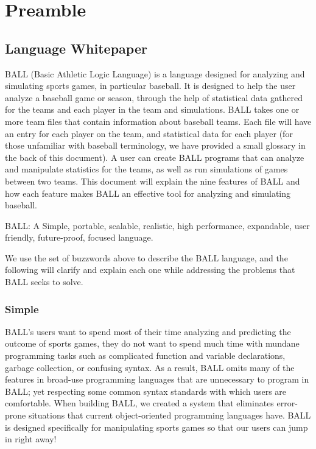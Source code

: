 
\chapter{Preamble}\label{intro}

\section{Language Whitepaper}\label{whitepaper}
BALL (Basic Athletic Logic Language) is a language designed for analyzing and simulating sports games, in particular baseball. It is designed to help the user analyze a baseball game or season, through the help of statistical data gathered for the teams and each player in the team and simulations. BALL takes one or more team files that contain information about baseball teams. Each file will have an entry for each player on the team, and statistical data for each player (for those unfamiliar with baseball terminology, we have provided a small glossary in the back of this document).  A user can create BALL programs that can analyze and manipulate statistics for the teams, as well as run simulations of games between two teams. This document will explain the nine features of BALL and how each feature makes BALL an effective tool for analyzing and simulating baseball.

BALL: A Simple, portable, scalable, realistic, high performance, expandable, user friendly, future-proof, focused language.

We use the set of buzzwords above to describe the BALL language, and the following will clarify and explain each one while addressing the problems that BALL seeks to solve.

\subsection{Simple}
BALL's users want to spend most of their time analyzing and predicting the outcome of sports games, they do not want to spend much time with mundane programming tasks such as complicated function and variable declarations, garbage collection, or confusing syntax. As a result, BALL omits many of the features in broad-use programming languages that are unnecessary to program in BALL; yet respecting some common syntax standards with which users are comfortable. When building BALL, we created a system that eliminates error-prone situations that current object-oriented programming languages have.  BALL is designed specifically for manipulating sports games so that our users can jump in right away!

